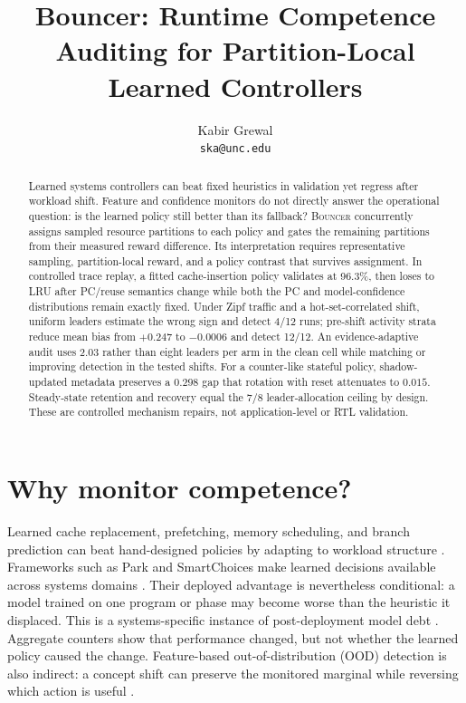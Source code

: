 \documentclass{article}
\title{Bouncer: Runtime Competence Auditing for Partition-Local Learned Controllers}
\author{Kabir Grewal \\
  \texttt{ska@unc.edu}}
\newcommand{\system}{\textsc{Bouncer}\xspace}
\begin{document}
\maketitle

\begin{abstract}
Learned systems controllers can beat fixed heuristics in validation yet regress
after workload shift.  Feature and confidence monitors do not directly answer
the operational question: is the learned policy still better than its fallback?
\system concurrently assigns sampled resource partitions to each policy and
gates the remaining partitions from their measured reward difference.  Its
interpretation requires representative sampling, partition-local reward, and a
policy contrast that survives assignment.  In controlled trace replay, a fitted
cache-insertion policy validates at 96.3\%, then loses to LRU after PC/reuse
semantics change while both the PC and model-confidence distributions remain
exactly fixed.  Under Zipf traffic and a hot-set-correlated shift, uniform
leaders estimate the wrong sign and detect 4/12 runs; pre-shift activity strata
reduce mean bias from $+0.247$ to $-0.0006$ and detect 12/12.  An evidence-adaptive
audit uses 2.03 rather than eight leaders per arm in the clean cell while matching
or improving detection in the tested shifts.  For a counter-like stateful policy,
shadow-updated metadata preserves a $0.298$ gap that rotation with reset attenuates
to $0.015$.  Steady-state retention and recovery equal the $7/8$
leader-allocation ceiling by design.  These are controlled mechanism repairs,
not application-level or RTL validation.
\end{abstract}

\section{Why monitor competence?}

Learned cache replacement, prefetching, memory scheduling, and branch prediction
can beat hand-designed policies by adapting to workload structure
\citep{ipek2008selfoptimizing,liu2020imitationcache,bera2021pythia,jain2016hawkeye,shi2019glider}.
Frameworks such as Park and SmartChoices make learned decisions available across
systems domains \citep{mao2019park,carstens2023smartchoices}.  Their deployed
advantage is nevertheless conditional: a model trained on one program or phase
may become worse than the heuristic it displaced.  This is a systems-specific
instance of post-deployment model debt \citep{sculley2015technicaldebt}.
Aggregate counters show that performance changed, but not whether the learned
policy caused the change.  Feature-based out-of-distribution (OOD) detection is
also indirect: a concept shift can preserve the monitored marginal while
reversing which action is useful
\citep{hendrycks2017baseline,gama2014survey,rabanser2019failing}.
\end{document}

